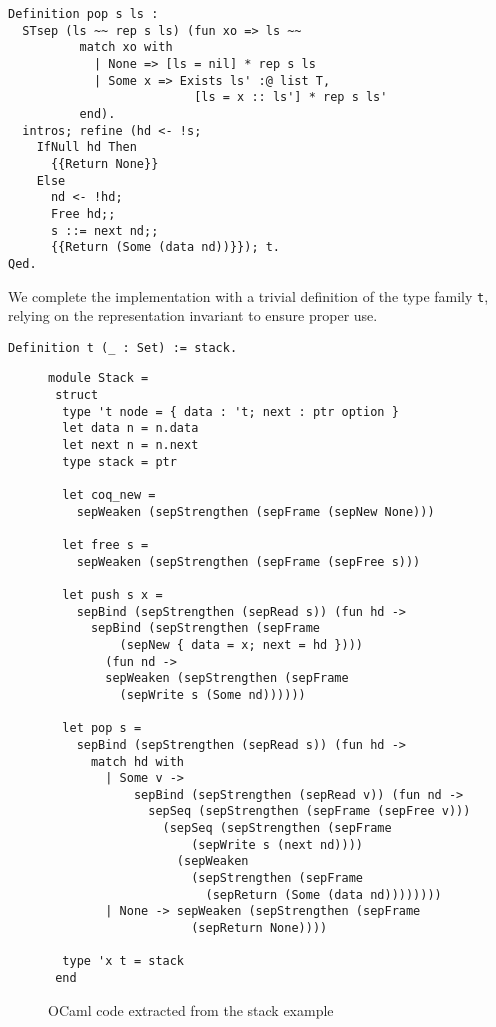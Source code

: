 \documentclass[preprint,nocopyrightspace]{sigplanconf}
\newcommand{\cd}[1]{\texttt{#1}}
\begin{document}
\begin{verbatim}
Definition pop s ls :
  STsep (ls ~~ rep s ls) (fun xo => ls ~~
          match xo with
            | None => [ls = nil] * rep s ls
            | Some x => Exists ls' :@ list T,
                          [ls = x :: ls'] * rep s ls'
          end).
  intros; refine (hd <- !s;
    IfNull hd Then
      {{Return None}}
    Else
      nd <- !hd;
      Free hd;;
      s ::= next nd;;
      {{Return (Some (data nd))}}); t.
Qed.
\end{verbatim}

We complete the implementation with a trivial definition of the type family \cd{t}, relying on the representation invariant to ensure proper use.

\begin{verbatim}
Definition t (_ : Set) := stack.
\end{verbatim}

\begin{figure}
  \begin{verbatim}
module Stack = 
 struct 
  type 't node = { data : 't; next : ptr option }
  let data n = n.data
  let next n = n.next
  type stack = ptr
  
  let coq_new =
    sepWeaken (sepStrengthen (sepFrame (sepNew None)))
  
  let free s =
    sepWeaken (sepStrengthen (sepFrame (sepFree s)))
  
  let push s x =
    sepBind (sepStrengthen (sepRead s)) (fun hd ->
      sepBind (sepStrengthen (sepFrame
          (sepNew { data = x; next = hd })))
        (fun nd ->
        sepWeaken (sepStrengthen (sepFrame
          (sepWrite s (Some nd))))))
  
  let pop s =
    sepBind (sepStrengthen (sepRead s)) (fun hd ->
      match hd with
        | Some v ->
            sepBind (sepStrengthen (sepRead v)) (fun nd ->
              sepSeq (sepStrengthen (sepFrame (sepFree v)))
                (sepSeq (sepStrengthen (sepFrame
                    (sepWrite s (next nd))))
                  (sepWeaken
                    (sepStrengthen (sepFrame
                      (sepReturn (Some (data nd))))))))
        | None -> sepWeaken (sepStrengthen (sepFrame
                    (sepReturn None))))
  
  type 'x t = stack
 end
  \end{verbatim}

  \caption{\label{extracted}OCaml code extracted from the stack example}
\end{figure}
\end{document}
